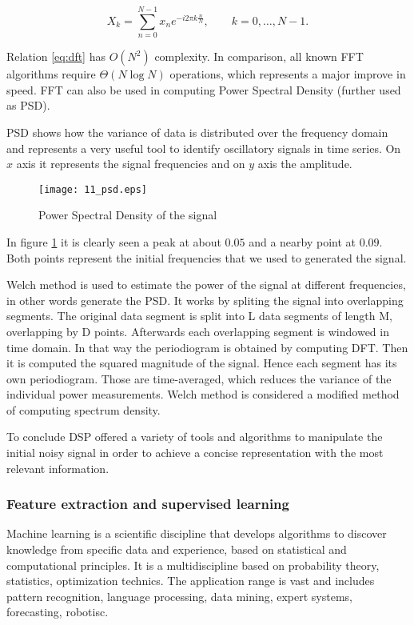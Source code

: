 \begin{equation} \label{eq:dft}
 X_k = \sum_{n=0}^{N-1} x_n e^{-i2\pi k\frac{n}{N}}, \qquad k= 0,\ldots , N-1.
\end{equation}

Relation \eqref{eq:dft} has $O(N^2)$ complexity. In comparison, all known FFT algorithms require $\Theta (N \log N)$ operations, which represents a major improve in speed. FFT can also be used in computing Power Spectral Density (further used as PSD).

PSD shows how the variance of data is distributed over the frequency domain and represents a very useful tool to identify oscillatory signals in time series. On $x$ axis it represents the signal frequencies and on $y$ axis the amplitude. 

\begin{figure}[!ht]
\centering
  \texttt{[image: 11\_psd.eps]}
\caption{Power Spectral Density of the signal}
\label{fig:psd}
\end{figure}

In figure \ref{fig:psd} it is clearly seen a peak at about $0.05$ and a nearby point at $0.09$. Both points represent the initial frequencies that we used to generated the signal. 

Welch method is used to estimate the power of the signal at different frequencies, in other words generate the PSD. It works by spliting the signal into overlapping segments. The original data segment is split into L data segments of length M, overlapping by D points. Afterwards each overlapping segment is windowed in time domain. In that way the periodiogram is obtained by computing DFT. Then it is computed the squared magnitude of the signal. Hence each segment has its own periodiogram. Those are time-averaged, which reduces the variance of the individual power measurements. Welch method is considered a modified method of computing spectrum density.

To conclude DSP offered a variety of tools and algorithms to manipulate the initial noisy signal in order to achieve a concise representation with the most relevant information.

\subsubsection{Feature extraction and supervised learning}
Machine learning is a scientific discipline that develops algorithms to discover knowledge from specific data and experience, based on statistical and computational principles. It is a multidiscipline based on probability theory, statistics, optimization technics. The application range is vast and includes pattern recognition, language processing, data mining, expert systems, forecasting, robotisc. 

